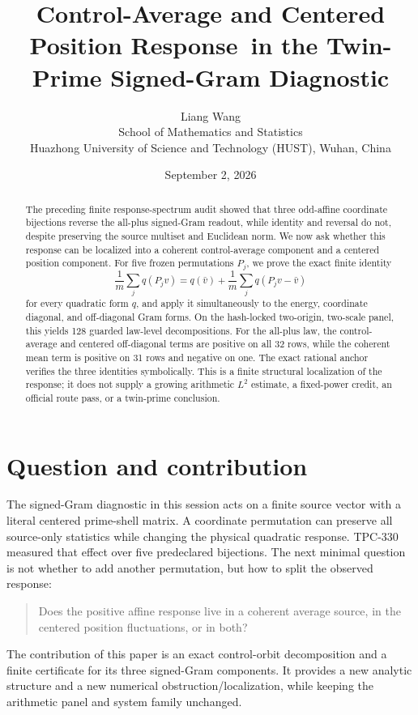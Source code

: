 \documentclass[10pt]{article}
\title{Control-Average and Centered Position Response\
  \large in the Twin-Prime Signed-Gram Diagnostic}
\author{Liang Wang\\
School of Mathematics and Statistics\\
Huazhong University of Science and Technology (HUST), Wuhan, China}
\date{September 2, 2026}
\begin{document}
\maketitle

\begin{abstract}
The preceding finite response-spectrum audit showed that three odd-affine
coordinate bijections reverse the all-plus signed-Gram readout, while identity
and reversal do not, despite preserving the source multiset and Euclidean
norm.  We now ask whether this response can be localized into a coherent
control-average component and a centered position component.  For five frozen
permutations $P_j$, we prove the exact finite identity
\[
 \frac1m\sum_j q(P_jv)=q(\bar v)+\frac1m\sum_j q(P_jv-\bar v)
\]
for every quadratic form $q$, and apply it simultaneously to the energy,
coordinate diagonal, and off-diagonal Gram forms.  On the hash-locked
two-origin, two-scale panel, this yields 128 guarded law-level decompositions.
For the all-plus law, the control-average and centered off-diagonal terms are
positive on all 32 rows, while the coherent mean term is positive on 31 rows
and negative on one.  The exact rational anchor verifies the three identities
symbolically.  This is a finite structural localization of the response; it
does not supply a growing arithmetic $L^2$ estimate, a fixed-power credit, an
official route pass, or a twin-prime conclusion.
\end{abstract}

\section{Question and contribution}

The signed-Gram diagnostic in this session acts on a finite source vector with
a literal centered prime-shell matrix.  A coordinate permutation can preserve
all source-only statistics while changing the physical quadratic response.
TPC-330 measured that effect over five predeclared bijections.  The next
minimal question is not whether to add another permutation, but how to split
the observed response:

\begin{quote}
Does the positive affine response live in a coherent average source, in the
centered position fluctuations, or in both?
\end{quote}

The contribution of this paper is an exact control-orbit decomposition and a
finite certificate for its three signed-Gram components.  It provides a new
analytic structure and a new numerical obstruction/localization, while
keeping the arithmetic panel and system family unchanged.
\end{document}
